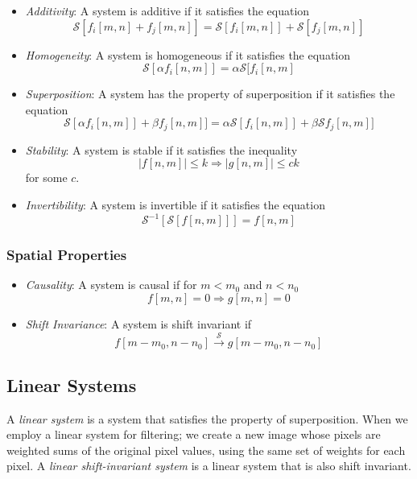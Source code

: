 \documentclass{article}
\begin{document}
\begin{itemize}
	\item \emph{Additivity}: A system is additive if it satisfies the equation
    \[
    	\mathcal{S}[f_i[m, n] + f_j[m, n]] = \mathcal{S}[f_i[m, n]] + \mathcal{S}[f_j[m, n]]
    \]

    \item  \emph{Homogeneity}: A system is homogeneous if it satisfies the equation
    \[
		\mathcal{S}[\alpha f_i[n, m]] = \alpha\mathcal{S}[f_i[n, m]
    \]
	
    \item \emph{Superposition}: A system has the property of superposition if it satisfies the equation
    \[
    	\mathcal{S}[\alpha f_i[n, m]] + \beta f_j[n, m]] = \alpha\mathcal{S}[f_i[n, m]] + \beta\mathcal{S}f_j[n, m]]
    \]

	\item \emph{Stability}: A system is stable if it satisfies the inequality
    \[
    	\left\vert f[n, m] \right\vert \leq k \Longrightarrow \left\vert	g[n, m] \right\vert \leq ck
    \]
    for some $c$.
	
    \item \emph{Invertibility}: A system is invertible if it satisfies the equation
    \[
    	\mathcal{S}^{-1}[\mathcal{S}[f[n, m]]] = f[n, m]
    \]
\end{itemize}

\subsubsection*{Spatial Properties}

\begin{itemize}
	\item \emph{Causality}: A system is causal if for $m < m_0$ and $n < n_0$
    \[
    	f[m, n] = 0 \Longrightarrow g[m, n] = 0
    \]

    \item \emph{Shift Invariance}: A system is shift invariant if
    \[
    	f[m - m_0, n - n_0] \xrightarrow{\mathcal{S}} g[m - m_0, n - n_0]
    \]
\end{itemize}

\subsection{Linear Systems}

A \emph{linear system} is a system that satisfies the property of superposition. When we employ a linear system for filtering; we create a new image whose pixels are weighted sums of the original pixel values, using the same set of weights for each pixel. A \emph{linear shift-invariant system} is a linear system that is also shift invariant.
\end{document}
